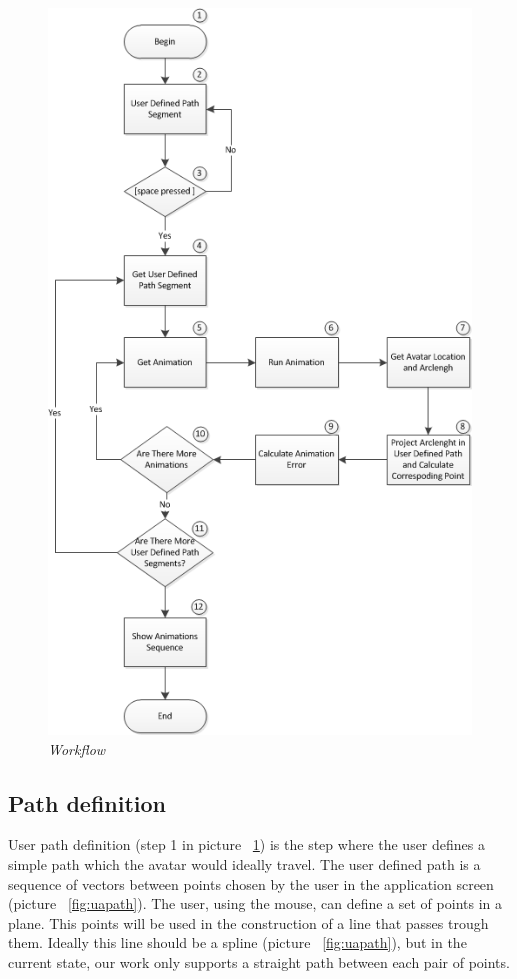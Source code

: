 \documentclass[a4paper]{article}
\begin{document}
\begin{figure}[hbtp]
\begin{center}
\includegraphics[scale=0.8]{Images/fluxograma.png} 
\caption{\textit{Workflow}}
\label{fig:work}
\end{center}
\end{figure}



\subsection{Path definition}
User path definition (step 1 in picture ~\ref{fig:work}) is the step where the user defines a simple path which the avatar would ideally travel.   The user defined path is a sequence of vectors between points chosen by the user in the application screen (picture ~\ref{fig:uapath}). The user, using the mouse, can define a set of points in a plane. This points will be used in the construction of a line that passes trough them. Ideally this line should be a spline (picture ~\ref{fig:uapath}), but in the current state, our work only supports a straight path between each pair of points. \\
\end{document}
